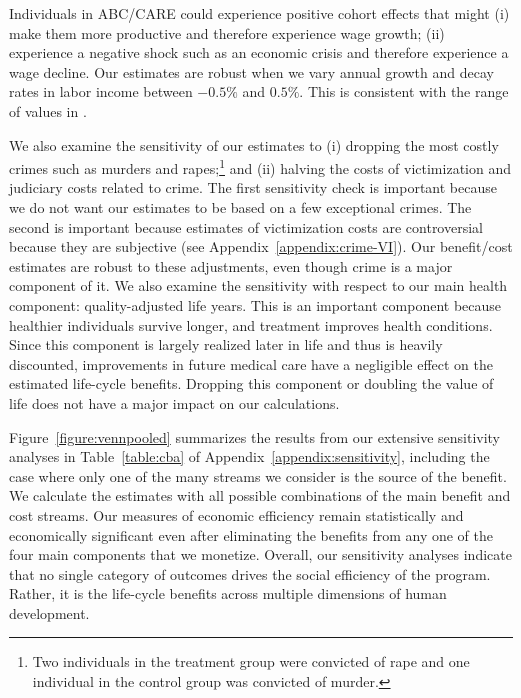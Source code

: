 Individuals in ABC/CARE could experience positive cohort effects that might (i) make them more productive and therefore experience wage growth; (ii) experience a negative shock such as an economic crisis and therefore experience a wage decline. Our estimates are robust when we vary annual growth and decay rates in labor income between $-0.5\%$ and $0.5\%$. This is consistent with the range of values in \citet{Lagakos_Moll_etal_2016_LifeCycle_NBER}.

We also examine the sensitivity of our estimates to (i) dropping the most costly crimes such as murders and rapes;\footnote{Two individuals in the treatment group were convicted of rape and one individual in the control group was convicted of murder.} and (ii) halving the costs of victimization and judiciary costs related to crime. The first sensitivity check is important because we do not want our estimates to be based on a few exceptional crimes. The second is important because estimates of victimization costs are controversial because they are subjective (see  Appendix~\ref{appendix:crime-VI}). Our benefit/cost estimates are robust to these adjustments, even though crime is a major component of it. We also examine the sensitivity with respect to our main health component: quality-adjusted life years. This is an important component because healthier individuals survive longer, and treatment improves health conditions. Since this component is largely realized later in life and thus is heavily discounted, improvements in future medical care have a negligible effect on the estimated life-cycle benefits. Dropping this component or doubling the value of life does not have a major impact on our calculations.

Figure~\ref{figure:vennpooled} summarizes the results from our extensive sensitivity analyses in Table~\ref{table:cba} of Appendix~\ref{appendix:sensitivity}, including the case where only one of the many streams we consider is the source of the benefit. We calculate the estimates with all possible combinations of the main benefit and cost streams. Our measures of economic efficiency remain statistically and economically significant even after eliminating the benefits from any one of the four main components that we monetize.  Overall, our sensitivity analyses indicate that no single category of outcomes drives the social efficiency of the program. Rather, it is the life-cycle benefits across multiple dimensions of human development.

